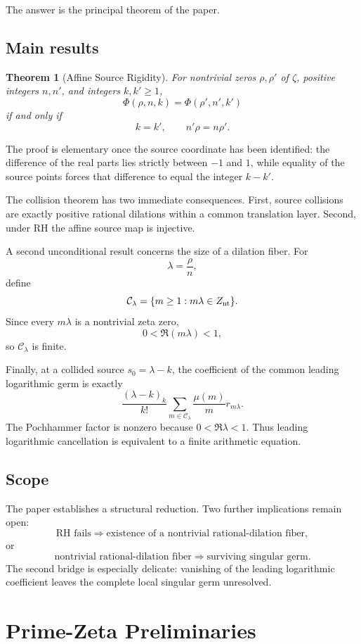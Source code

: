 \documentclass[11pt]{article}
\newtheorem{theorem}{Theorem}[section]
\theoremstyle{definition}
\newcommand{\C}{\mathcal C}
\newcommand{\Znt}{Z_{\rm nt}}
\newcommand{\PhiA}{\Phi}
\begin{document}
The answer is the principal theorem of the paper.

\subsection{Main results}

\begin{theorem}[Affine Source Rigidity]
\label{thm:rigidity-intro}
For nontrivial zeros $\rho,\rho'$ of $\zeta$, positive integers $n,n'$, and integers $k,k'\ge1$,
\[
\PhiA(\rho,n,k)=\PhiA(\rho',n',k')
\]
if and only if
\[
k=k',\qquad n'\rho=n\rho'.
\]
\end{theorem}

The proof is elementary once the source coordinate has been identified: the difference of the real parts lies strictly between $-1$ and $1$, while equality of the source points forces that difference to equal the integer $k-k'$.

The collision theorem has two immediate consequences. First, source collisions are exactly positive rational dilations within a common translation layer. Second, under RH the affine source map is injective.

A second unconditional result concerns the size of a dilation fiber. For
\[
\lambda=\frac{\rho}{n},
\]
define
\[
\C_\lambda=\{m\ge1:m\lambda\in\Znt\}.
\]
Since every $m\lambda$ is a nontrivial zeta zero,
\[
0<\Re(m\lambda)<1,
\]
so $\C_\lambda$ is finite.

Finally, at a collided source $s_0=\lambda-k$, the coefficient of the common leading logarithmic germ is exactly
\[
\frac{(\lambda-k)_k}{k!}
\sum_{m\in\C_\lambda}\frac{\mu(m)}{m}r_{m\lambda}.
\]
The Pochhammer factor is nonzero because $0<\Re\lambda<1$. Thus leading logarithmic cancellation is equivalent to a finite arithmetic equation.

\subsection{Scope}

The paper establishes a structural reduction. Two further implications remain open:
\[
\mathrm{RH}\text{ fails}\Longrightarrow
\text{existence of a nontrivial rational-dilation fiber},
\]
or
\[
\text{nontrivial rational-dilation fiber}
\Longrightarrow
\text{surviving singular germ}.
\]
The second bridge is especially delicate: vanishing of the leading logarithmic coefficient leaves the complete local singular germ unresolved.

\section{Prime-Zeta Preliminaries}
\end{document}
